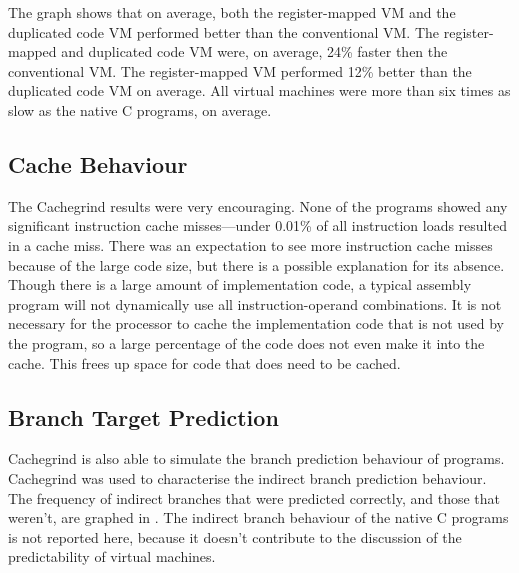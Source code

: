 		The graph shows that on average, both the register-mapped VM and the duplicated code VM performed better than the conventional VM. The register-mapped and duplicated code VM were, on average, 24\% faster then the conventional VM. The register-mapped VM performed 12\% better than the duplicated code VM on average. All virtual machines were more than six times as slow as the native C programs, on average.
	
		\subsection{Cache Behaviour}
		The Cachegrind results were very encouraging. None of the programs showed any significant instruction cache misses---under 0.01\% of all instruction loads resulted in a cache miss. There was an expectation to see more instruction cache misses because of the large code size, but there is a possible explanation for its absence. Though there is a large amount of implementation code, a typical assembly program will not dynamically use all instruction-operand combinations. It is not necessary for the processor to cache the implementation code that is not used by the program, so a large percentage of the code does not even make it into the cache. This frees up space for code that does need to be cached.
		
		\subsection{Branch Target Prediction}
		Cachegrind is also able to simulate the branch prediction behaviour of programs. Cachegrind was used to characterise the indirect branch prediction behaviour. The frequency of indirect branches that were predicted correctly, and those that weren't, are graphed in . The indirect branch behaviour of the native C programs is not reported here, because it doesn't contribute to the discussion of the predictability of virtual machines.
		

